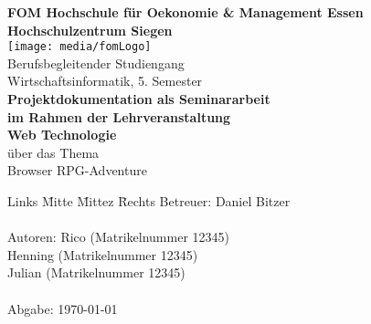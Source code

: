 \documentclass[12pt,oneside,titlepage]{scrartcl}
\newcommand{\myAutor}{Rico  (Matrikelnummer 12345)\\ \> \> \> 
Henning   (Matrikelnummer 12345)\\ \> \> \> 
Julian  (Matrikelnummer 12345)} %
\newcommand{\myAdresse}{Stra\ss e 123 \\ \> \> \> 57xxx Siegerland} %
\newcommand{\myTitel}{Browser RPG-Adventure} %
\newcommand{\myBetreuer}{Daniel Bitzer} %
\newcommand{\myLehrveranstaltung}{Web Technologie} %
\newcommand{\myMatrikelNr}{123456} %
\newcommand{\myAbgabeDatum}{\today} %
\newcommand{\mySemesterZahl}{5} %
\newcommand{\myHochschulName}{FOM Hochschule für Oekonomie \& Management Essen} %
\newcommand{\myHochschulStandort}{Siegen} %
\newcommand{\myStudiengang}{Wirtschaftsinformatik} %
\newcommand{\myThesisArt}{Projektdokumentation als Seminararbeit} %
\newcommand{\myAkademischerGrad}{Bachelor of Science (B. Sc.)} %
\begin{document}

\renewcommand{\refname}{Literaturverzeichnis}		%

\begin{titlepage} %
	\begin{center}
		\textbf{\myHochschulName}\\
		\textbf{Hochschulzentrum \myHochschulStandort}\\
		\vspace{1.5cm}
			\texttt{[image: media/fomLogo]} \\
		\vspace{1.5cm}
		Berufsbegleitender Studiengang\\
		\myStudiengang, \mySemesterZahl. Semester\\
		\vspace{2cm}
		\textbf{\myThesisArt}\\
		\textbf{im Rahmen der Lehrveranstaltung}\\
		\textbf{\myLehrveranstaltung}\\
		\vspace{2cm}
		über das Thema\\
		\Large{\myTitel}\\
		\vspace{0.2cm}
	\end{center}
	\normalsize
	\vfill
	\begin{tabbing}
		Links \= Mitte \=Mittez \= Rechts\kill
		Betreuer: \> \> \>\myBetreuer\\
		\> \> \\
		Autoren: \> \> \> \myAutor\\
		\> \> \>  \\
		Abgabe: \> \> \> \myAbgabeDatum
	\end{tabbing}
\end{titlepage}

\end{document}

